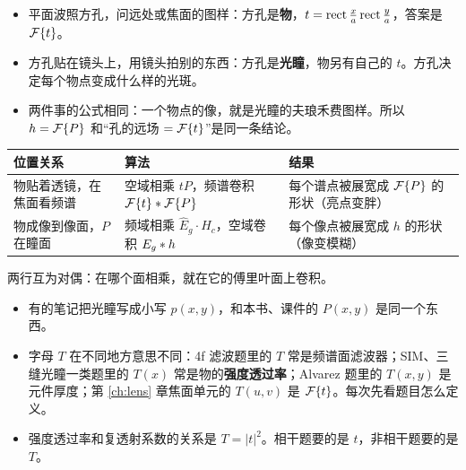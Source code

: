 \begin{itemize}
\item 平面波照方孔，问远处或焦面的图样：方孔是\textbf{物}，$t=\operatorname{rect}\frac xa\operatorname{rect}\frac ya$，答案是 $\mathcal{F}\{t\}$。
\item 方孔贴在镜头上，用镜头拍别的东西：方孔是\textbf{光瞳}，物另有自己的 $t$。方孔决定每个物点变成什么样的光斑。
\item 两件事的公式相同：一个物点的像，就是光瞳的夫琅禾费图样。所以 $h=\mathcal{F}\{P\}$ 和“孔的远场 $=\mathcal{F}\{t\}$”是同一条结论。
\end{itemize}

\begin{center}\small\renewcommand{\arraystretch}{1.35}
\begin{tabular}{@{}P{4.3cm}P{5.3cm}P{6.8cm}@{}}
\toprule
位置关系 & 算法 & 结果\\ \midrule
物贴着透镜，在焦面看频谱 & 空域相乘 $tP$，频谱卷积 $\mathcal{F}\{t\}\ast\mathcal{F}\{P\}$ & 每个谱点被展宽成 $\mathcal{F}\{P\}$ 的形状（亮点变胖）\\
物成像到像面，$P$ 在瞳面 & 频域相乘 $\hat E_g\cdot H_c$，空域卷积 $E_g\ast h$ & 每个像点被展宽成 $h$ 的形状（像变模糊）\\
\bottomrule
\end{tabular}
\end{center}
两行互为对偶：在哪个面相乘，就在它的傅里叶面上卷积。

\begin{warn}[符号撞车]
\begin{itemize}
\item 有的笔记把光瞳写成小写 $p(x,y)$，和本书、课件的 $P(x,y)$ 是同一个东西。
\item 字母 $T$ 在不同地方意思不同：4f 滤波题里的 $T$ 常是频谱面滤波器；SIM、三缝光瞳一类题里的 $T(x)$ 常是物的\textbf{强度透过率}；Alvarez 题里的 $T(x,y)$ 是元件厚度；第 \ref{ch:lens} 章焦面单元的 $T(u,v)$ 是 $\mathcal{F}\{t\}$。每次先看题目怎么定义。
\item 强度透过率和复透射系数的关系是 $T=|t|^2$。相干题要的是 $t$，非相干题要的是 $T$。
\end{itemize}
\end{warn}

